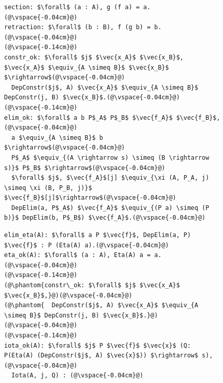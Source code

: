 \begin{figure}
\begin{minipage}{0.43\textwidth}
\begin{lstlisting}
section: $\forall$ (a : A), g (f a) = a.(@\vspace{-0.04cm}@)
retraction: $\forall$ (b : B), f (g b) = b.(@\vspace{-0.04cm}@)
(@\vspace{-0.14cm}@)
constr_ok: $\forall$ $j$ $\vec{x_A}$ $\vec{x_B}$, $\vec{x_A}$ $\equiv_{A \simeq B}$ $\vec{x_B}$ $\rightarrow$(@\vspace{-0.04cm}@)
  DepConstr($j$, A) $\vec{x_A}$ $\equiv_{A \simeq B}$ DepConstr(j, B) $\vec{x_B}$.(@\vspace{-0.04cm}@)
(@\vspace{-0.14cm}@)
elim_ok: $\forall$ a b P$_A$ P$_B$ $\vec{f_A}$ $\vec{f_B}$,(@\vspace{-0.04cm}@)
  a $\equiv_{A \simeq B}$ b $\rightarrow$(@\vspace{-0.04cm}@)
  P$_A$ $\equiv_{(A \rightarrow s) \simeq (B \rightarrow s)}$ P$_B$ $\rightarrow$(@\vspace{-0.04cm}@)
  $\forall$ $j$, $\vec{f_A}$[j] $\equiv_{\xi (A, P_A, j) \simeq \xi (B, P_B, j)}$ $\vec{f_B}$[j]$\rightarrow$(@\vspace{-0.04cm}@)
  DepElim(a, P$_A$) $\vec{f_A}$ $\equiv_{(P a) \simeq (P b)}$ DepElim(b, P$_B$) $\vec{f_A}$.(@\vspace{-0.04cm}@)
\end{lstlisting}
\end{minipage}
\hfill
\begin{minipage}{0.56\textwidth}
\begin{lstlisting}
elim_eta(A): $\forall$ a P $\vec{f}$, DepElim(a, P) $\vec{f}$ : P (Eta(A) a).(@\vspace{-0.04cm}@)
eta_ok(A): $\forall$ (a : A), Eta(A) a = a.(@\vspace{-0.04cm}@)
(@\vspace{-0.14cm}@)
(@\phantom{constr\_ok: $\forall$ $j$ $\vec{x_A}$ $\vec{x_B}$,}@)(@\vspace{-0.04cm}@)
(@\phantom{  DepConstr($j$, A) $\vec{x_A}$ $\equiv_{A \simeq B}$ DepConstr(j, B) $\vec{x_B}$.}@)(@\vspace{-0.04cm}@)
(@\vspace{-0.14cm}@)
iota_ok(A): $\forall$ $j$ P $\vec{f}$ $\vec{x}$ (Q: P(Eta(A) (DepConstr($j$, A) $\vec{x}$)) $\rightarrow$ s),(@\vspace{-0.04cm}@)
  Iota(A, j, Q) : (@\vspace{-0.04cm}@)

\end{lstlisting}
\end{minipage}
\end{figure}
